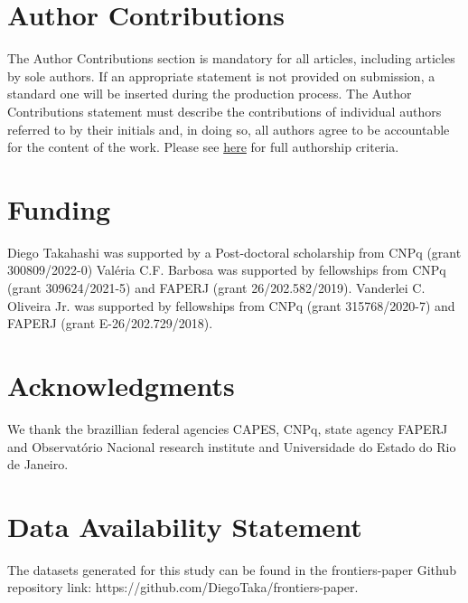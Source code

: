 \documentclass[utf8]{FrontiersinHarvard} %
\begin{document}
\section*{Author Contributions}

The Author Contributions section is mandatory for all articles, including articles by sole authors. If an appropriate statement is not provided on submission, a standard one will be inserted during the production process. The Author Contributions statement must describe the contributions of individual authors referred to by their initials and, in doing so, all authors agree to be accountable for the content of the work. Please see  \href{https://www.frontiersin.org/guidelines/policies-and-publication-ethics#authorship-and-author-responsibilities}{here} for full authorship criteria.

\section*{Funding}
Diego Takahashi was supported by a Post-doctoral scholarship from CNPq (grant 300809/2022-0) Valéria C.F. Barbosa
was supported by fellowships from CNPq (grant 309624/2021-5) and FAPERJ (grant 26/202.582/2019). Vanderlei C. Oliveira Jr. was supported by fellowships from CNPq (grant 315768/2020-7) and FAPERJ (grant E-26/202.729/2018). 

\section*{Acknowledgments}
We thank the brazillian federal agencies CAPES, CNPq, state agency FAPERJ and Observatório Nacional research institute and Universidade do Estado do Rio de Janeiro.

\section*{Data Availability Statement}
The datasets generated for this study can be found in the frontiers-paper Github repository link: https://github.com/DiegoTaka/frontiers-paper.


\end{document}
